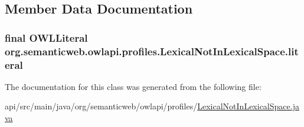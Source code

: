 \subsection{Member Data Documentation}
\hypertarget{classorg_1_1semanticweb_1_1owlapi_1_1profiles_1_1_lexical_not_in_lexical_space_ae42efc591f30f8b4ae29b9d841777a74}{
\subsubsection[{literal}]{\setlength{\rightskip}{0pt plus 5cm}final {\bf O\-W\-L\-Literal} org.\-semanticweb.\-owlapi.\-profiles.\-Lexical\-Not\-In\-Lexical\-Space.\-literal\hspace{0.3cm}{\ttfamily [private]}}}\label{classorg_1_1semanticweb_1_1owlapi_1_1profiles_1_1_lexical_not_in_lexical_space_ae42efc591f30f8b4ae29b9d841777a74}


The documentation for this class was generated from the following file\-:\begin{DoxyCompactItemize}
\item 
api/src/main/java/org/semanticweb/owlapi/profiles/\hyperlink{_lexical_not_in_lexical_space_8java}{Lexical\-Not\-In\-Lexical\-Space.\-java}\end{DoxyCompactItemize}
